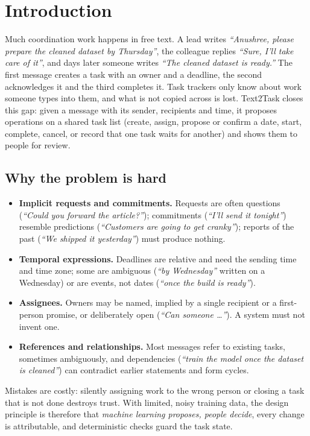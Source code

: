 \chapter{Introduction}
\label{ch:intro}

Much coordination work happens in free text. A lead writes \emph{``Anushree, please prepare the cleaned dataset by Thursday''}, the colleague replies \emph{``Sure, I'll take care of it''}, and days later someone writes \emph{``The cleaned dataset is ready.''} The first message creates a task with an owner and a deadline, the second acknowledges it and the third completes it. Task trackers only know about work someone types into them, and what is not copied across is lost. Text2Task closes this gap: given a message with its sender, recipients and time, it proposes operations on a shared task list (create, assign, propose or confirm a date, start, complete, cancel, or record that one task waits for another) and shows them to people for review.

\section{Why the problem is hard}
\begin{itemize}
  \item \textbf{Implicit requests and commitments.} Requests are often questions (\emph{``Could you forward the article?''}); commitments (\emph{``I'll send it tonight''}) resemble predictions (\emph{``Customers are going to get cranky''}); reports of the past (\emph{``We shipped it yesterday''}) must produce nothing.
  \item \textbf{Temporal expressions.} Deadlines are relative and need the sending time and time zone; some are ambiguous (\emph{``by Wednesday''} written on a Wednesday) or are events, not dates (\emph{``once the build is ready''}).
  \item \textbf{Assignees.} Owners may be named, implied by a single recipient or a first-person promise, or deliberately open (\emph{``Can someone \ldots''}). A system must not invent one.
  \item \textbf{References and relationships.} Most messages refer to existing tasks, sometimes ambiguously, and dependencies (\emph{``train the model once the dataset is cleaned''}) can contradict earlier statements and form cycles.
\end{itemize}
Mistakes are costly: silently assigning work to the wrong person or closing a task that is not done destroys trust. With limited, noisy training data, the design principle is therefore that \emph{machine learning proposes, people decide}, every change is attributable, and deterministic checks guard the task state.

